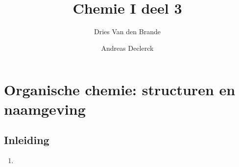 \documentclass[a4paper,12pt]{article}
\begin{document}
\title{Chemie I deel 3}
    \author{Dries Van den Brande \and Andreas Declerck}

    \maketitle
    \date{}
    \setcounter{section}{11}


    \section{Organische chemie: structuren en naamgeving}
    \subsection*{Inleiding}
    \begin{enumerate}
        \item 
    \end{enumerate}
\end{document}
